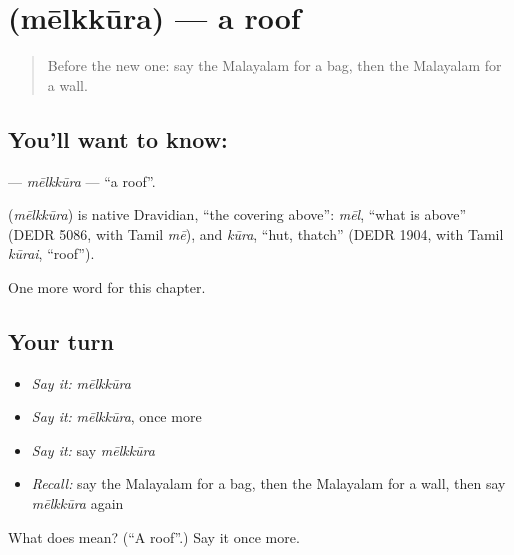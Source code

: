 \section[\texorpdfstring{\ml{മേൽക്കൂര} (mēlkkūra)}{മേൽക്കൂര (mēlkkūra)}]{ (mēlkkūra) — a roof}

\label{lesson:ML-C147-melkkura}



\begin{quote}
Before the new one: say the Malayalam for a bag, then the Malayalam for a wall.
\end{quote}

\subsection*{You'll want to know: }
\textbf{} — \emph{mēlkkūra} — \textquotedblleft{}a roof\textquotedblright{}.

\begin{cousinweb}
\textbf{} (\emph{mēlkkūra}) is native Dravidian, \textquotedblleft{}the covering above\textquotedblright{}: \emph{mēl}, \textquotedblleft{}what is above\textquotedblright{} (DEDR 5086, with Tamil \emph{mē}), and \emph{kūra}, \textquotedblleft{}hut, thatch\textquotedblright{} (DEDR 1904, with Tamil \emph{kūrai}, \textquotedblleft{}roof\textquotedblright{}).
\end{cousinweb}

\begin{grammarlens}[title={What you've built}]
One more word for this chapter.
\end{grammarlens}

\subsection*{Your turn}
\begin{itemize}
\raggedright
  \item \emph{Say it:} \emph{mēlkkūra}
  \item \emph{Say it:} \emph{mēlkkūra}, once more
  \item \emph{Say it:} say \emph{mēlkkūra}
  \item \emph{Recall:} say the Malayalam for a bag, then the Malayalam for a wall, then say \emph{mēlkkūra} again
\end{itemize}

\begin{tcolorbox}[breakable,colback=teal!4,colframe=teal!35!black,title={Before you move on}]
What does  mean? (\textquotedblleft{}A roof\textquotedblright{}.) Say it once more.
\end{tcolorbox}
